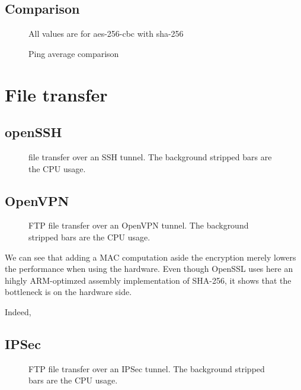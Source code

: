 \subsection{Comparison}

\begin{figure}[ht]

\caption{Ping average comparison}{All values are for aes-256-cbc with sha-256}
\label{fig:ping-benchmark-comparison}
\end{figure}


\section{File transfer}


\subsection{openSSH}

\begin{figure}[ht]

\caption{file transfer over an SSH tunnel. The background stripped bars are the CPU usage.}{}
\label{fig:openssh-bench}
\end{figure}

\subsection{OpenVPN}

\begin{figure}[ht]

\caption{FTP file transfer over an OpenVPN tunnel. The background stripped bars are the CPU usage.}{}
\label{fig:openvpn-ftp-bench}
\end{figure}

We can see that adding a MAC computation aside the encryption merely lowers the performance when using the hardware.
Even though OpenSSL uses here an hihgly ARM-optimzed assembly implementation of SHA-256, it shows that the bottleneck is on the hardware side.

Indeed, 

\subsection{IPSec}

\begin{figure}[ht]

\caption{FTP file transfer over an IPSec tunnel. The background stripped bars are the CPU usage.}{}
\label{fig:ipsec-ftp-bench}
\end{figure}

